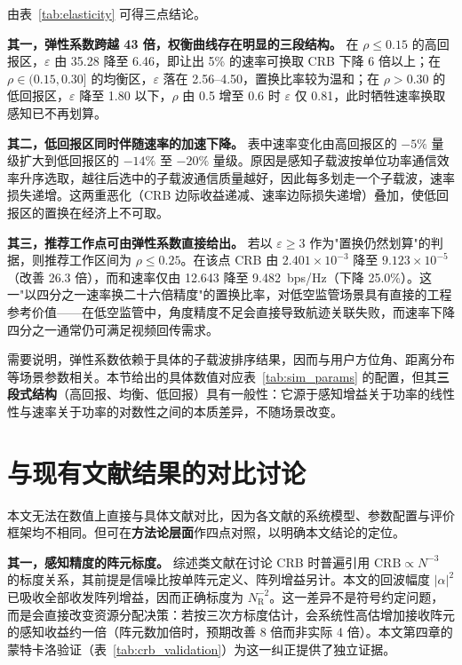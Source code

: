 由表~\ref{tab:elasticity} 可得三点结论。

\textbf{其一，弹性系数跨越 43 倍，权衡曲线存在明显的三段结构。} 在 $\rho\le0.15$ 的高回报区，$\varepsilon$ 由 35.28 降至 6.46，即让出 5\% 的速率可换取 CRB 下降 6 倍以上；在 $\rho\in(0.15,0.30]$ 的均衡区，$\varepsilon$ 落在 2.56--4.50，置换比率较为温和；在 $\rho>0.30$ 的低回报区，$\varepsilon$ 降至 1.80 以下，$\rho$ 由 0.5 增至 0.6 时 $\varepsilon$ 仅 0.81，此时牺牲速率换取感知已不再划算。

\textbf{其二，低回报区同时伴随速率的加速下降。} 表中速率变化由高回报区的 $-5\%$ 量级扩大到低回报区的 $-14\%$ 至 $-20\%$ 量级。原因是感知子载波按单位功率通信效率升序选取，越往后选中的子载波通信质量越好，因此每多划走一个子载波，速率损失递增。这两重恶化（CRB 边际收益递减、速率边际损失递增）叠加，使低回报区的置换在经济上不可取。

\textbf{其三，推荐工作点可由弹性系数直接给出。} 若以 $\varepsilon\ge3$ 作为"置换仍然划算"的判据，则推荐工作区间为 $\rho\le0.25$。在该点 CRB 由 $2.401\times10^{-3}$ 降至 $9.123\times10^{-5}$（改善 26.3 倍），而和速率仅由 12.643 降至 9.482~bps/Hz（下降 25.0\%）。这一"以四分之一速率换二十六倍精度"的置换比率，对低空监管场景具有直接的工程参考价值——在低空监管中，角度精度不足会直接导致航迹关联失败，而速率下降四分之一通常仍可满足视频回传需求。

需要说明，弹性系数依赖于具体的子载波排序结果，因而与用户方位角、距离分布等场景参数相关。本节给出的具体数值对应表~\ref{tab:sim_params} 的配置，但其\textbf{三段式结构}（高回报、均衡、低回报）具有一般性：它源于感知增益关于功率的线性性与速率关于功率的对数性之间的本质差异，不随场景改变。

\section{与现有文献结果的对比讨论}
\label{sec:exp_literature}

本文无法在数值上直接与具体文献对比，因为各文献的系统模型、参数配置与评价框架均不相同。但可在\textbf{方法论层面}作四点对照，以明确本文结论的定位。

\textbf{其一，感知精度的阵元标度。} 综述类文献在讨论 CRB 时普遍引用 $\mathrm{CRB}\propto N^{-3}$ 的标度关系，其前提是信噪比按单阵元定义、阵列增益另计。本文的回波幅度 $\lvert\alpha\rvert^{2}$ 已吸收全部收发阵列增益，因而正确标度为 $N_{\mathrm{R}}^{-2}$。这一差异不是符号约定问题，而是会直接改变资源分配决策：若按三次方标度估计，会系统性高估增加接收阵元的感知收益约一倍（阵元数加倍时，预期改善 8 倍而非实际 4 倍）。本文第四章的蒙特卡洛验证（表~\ref{tab:crb_validation}）为这一纠正提供了独立证据。

